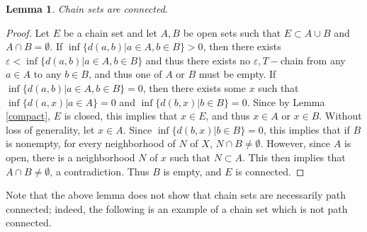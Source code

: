 \documentclass[11pt]{article}
\newtheorem{lem}[thm]{Lemma}
\begin{document}
\begin{lem}\label{chainconnected}
Chain sets are connected.
\end{lem}
\begin{proof}
Let $E$ be a chain set and let $A,B$ be open sets such that $E\subset A\cup B$ and $A\cap B=\emptyset$.  If $\inf\{d(a,b)|a\in A, b\in B\}>0$, then there exists $\varepsilon<\inf\{d(a,b)|a\in A, b\in B\}$ and thus there exists no $\varepsilon, T-$chain from any $a\in A$ to any $b\in B$, and thus one of $A$ or $B$ must be empty.  If $\inf\{d(a,b)|a\in A, b\in B\}=0$, then there exists some $x$ such that $\inf\{d(a,x)|a\in A\}=0$ and $\inf\{d(b,x)|b\in B\}=0$.  Since by Lemma \ref{compact}, $E$ is closed, this implies that $x\in E$, and thus $x\in A$ or $x\in B$.  Without loss of generality, let $x\in A$.  Since $\inf\{d(b,x)|b\in B\}=0$, this implies that if $B$ is nonempty, for every neighborhood of $N$ of $X$, $N\cap B\not= \emptyset$.  However, since $A$ is open, there is a neighborhood $N$ of $x$ such that $N\subset A$.  This then implies that $A\cap B\not = \emptyset$, a contradiction.  Thus $B$ is empty, and $E$ is connected.

\end{proof}

Note that the above lemma does not show that chain sets are necessarily path connected; indeed, the following is an example of a chain set which is not path connected. 
\end{document}

